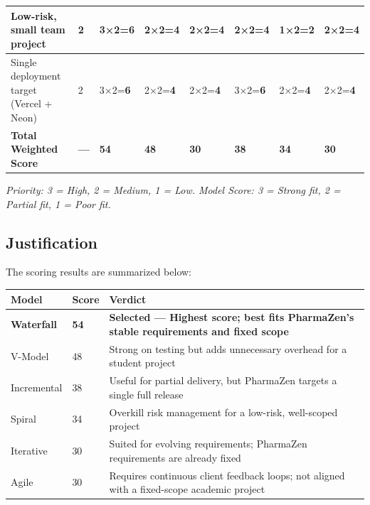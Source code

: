 \documentclass[12pt, a4paper]{article}
\begin{document}
\begin{longtable}{|L{4.0cm}|C{0.8cm}|C{1.5cm}|C{1.3cm}|C{1.5cm}|C{1.6cm}|C{1.2cm}|C{1.2cm}|}
  \small Low-risk, small team project &
  \small 2 & \small 3×2=\textbf{6} & \small 2×2=\textbf{4} & \small 2×2=\textbf{4} & \small 2×2=\textbf{4} & \small 1×2=\textbf{2} & \small 2×2=\textbf{4} \\
  \hline

  \small Single deployment target (Vercel + Neon) &
  \small 2 & \small 3×2=\textbf{6} & \small 2×2=\textbf{4} & \small 2×2=\textbf{4} & \small 3×2=\textbf{6} & \small 2×2=\textbf{4} & \small 2×2=\textbf{4} \\
  \hline

  \textbf{\small Total Weighted Score} &
  \textbf{---} &
  \textbf{\color{pharmagreen}54} &
  \textbf{48} &
  \textbf{30} &
  \textbf{38} &
  \textbf{34} &
  \textbf{30} \\
  \hline
\end{longtable}

\noindent\small\textit{Priority: 3 = High, 2 = Medium, 1 = Low. \quad Model Score: 3 = Strong fit, 2 = Partial fit, 1 = Poor fit.}

\subsection{Justification}

The scoring results are summarized below:

\vspace{6pt}
\renewcommand{\arraystretch}{1.5}
\begin{tabular}{|L{3.8cm}|C{2.5cm}|L{8.5cm}|}
  \hline
  \textbf{\color{white}Model} & \textbf{\color{white}Score} & \textbf{\color{white}Verdict} \\
  \hline
  \textbf{Waterfall} & \textbf{\color{pharmagreen}54} & \textbf{Selected --- Highest score; best fits PharmaZen's stable requirements and fixed scope} \\
  \hline
  V-Model & 48 & Strong on testing but adds unnecessary overhead for a student project \\
  \hline
  Incremental & 38 & Useful for partial delivery, but PharmaZen targets a single full release \\
  \hline
  Spiral & 34 & Overkill risk management for a low-risk, well-scoped project \\
  \hline
  Iterative & 30 & Suited for evolving requirements; PharmaZen requirements are already fixed \\
  \hline
  Agile & 30 & Requires continuous client feedback loops; not aligned with a fixed-scope academic project \\
  \hline
\end{tabular}
\end{document}

